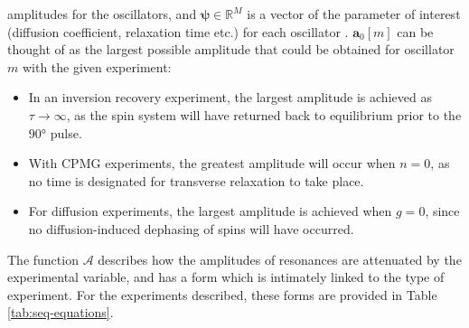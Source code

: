 amplitudes for the oscillators, and $\symbf{\psi} \in \mathbb{R}^M$ is a vector
of the parameter of interest (diffusion coefficient, relaxation time etc.) for
each oscillator . $\symbf{a}_0 [m]$ can be thought of as the largest
possible amplitude that could be obtained for oscillator $m$ with the given
experiment:
\begin{itemize}
    \item In an inversion recovery experiment, the largest amplitude is
        achieved as $\tau \rightarrow \infty$, as the spin system will have
        returned back to equilibrium prior to the \ang{90} pulse.
    \item With \ac{CPMG} experiments, the greatest amplitude will occur when
        $n = 0$, as no time is designated for transverse
        relaxation to take place.
    \item For diffusion experiments, the largest amplitude is achieved when
        $g=0$, since no diffusion-induced dephasing of spins will have
        occurred.
\end{itemize}
The function $\mathcal{A}$ describes how the amplitudes of resonances are
attenuated by the experimental variable, and has a form which is intimately
linked to the type of experiment. For the experiments described, these forms
are provided in Table \ref{tab:seq-equations}.
